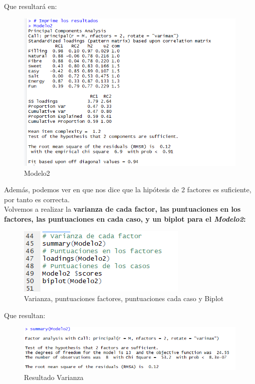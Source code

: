\documentclass[12pt,a4paper]{book}
\begin{document}
Que resultará en: 
\begin{figure}[H]
\centering
\includegraphics[scale=1]{Captura16.png} 
\caption{Modelo2}
\label{fig:mm}
\end{figure}
Además, podemos ver en que nos dice que la hipótesis de 2 factores es suficiente, por tanto es correcta.
\\Volvemos a realizar la \textbf{varianza de cada factor, las puntuaciones en los factores, las puntuaciones en cada caso, y un biplot para el \textit{Modelo2}:}
\begin{figure}[H]
\centering
\includegraphics[scale=1]{Captura17.png} 
\caption{Varianza, puntuaciones factores, puntuaciones cada caso y Biplot}
\label{fig:vpp}
\end{figure}
Que resultan: 
\begin{figure}[H]
\centering
\includegraphics[scale=0.75]{Captura18.png} 
\caption{Resultado Varianza}
\label{fig:rv}
\end{figure}
\end{document}
